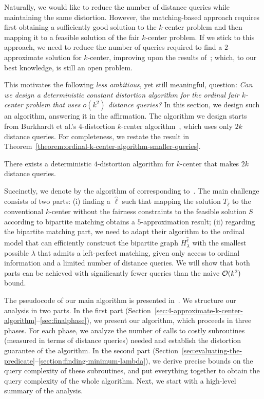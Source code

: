 
Naturally, we would like to reduce the number of distance queries while maintaining the same distortion. However, the matching-based approach requires first obtaining a sufficiently good solution to the $k$-center problem and then mapping it to a feasible solution of the fair $k$-center problem. If we stick to this approach, we need to reduce the number of queries required to find a $2$-approximate solution for $k$-center, improving upon the results of~\citet{burkhardt2024low}; which, to our best knowledge, is still an open problem.

This motivates the following \emph{less ambitious}, yet still meaningful, question: \emph{Can we design a deterministic constant distortion algorithm for the ordinal fair $k$-center problem that uses $o(k^2)$ distance queries?}
In this section, we design such an algorithm, answering it in the affirmation. The algorithm we design starts from Burkhardt et al.'s $4$-distortion $k$-center algorithm~\cite{burkhardt2024low}, which uses only $2k$ distance queries. For completeness, we restate the result in Theorem~\ref{theorem:ordinal-k-center-algorithm-smaller-queries}.

\begin{theorem}
    \label{theorem:ordinal-k-center-algorithm-smaller-queries}
    There exists a deterministic $4$-distortion algorithm for $k$-center that makes $2k$ distance queries. 
\end{theorem}

Succinctly, we denote by \bcfrss the algorithm of \citet{burkhardt2024low} corresponding to~.
The main challenge consists of two parts: (i) finding a $\hat{\ell}$ such that mapping the solution $T_{\hat{\ell}}$ to the conventional $k$-center without the fairness constraints to the feasible solution $S$ according to bipartite matching obtains a $5$-approximation result; (ii) regarding the bipartite matching part, we need to adapt their algorithm to the ordinal model that can efficiently construct the bipartite graph $H^{\hat{\ell}}_{\lambda}$ with the smallest possible $\lambda$ that admits a left-perfect matching, given only access to ordinal information and a limited number of distance queries.
We will show that both parts can be achieved with significantly fewer queries than the naive $\mathcal{O}(k^2)$ bound.

The pseudocode of our main algorithm is presented in~. 
We structure our analysis in two parts. 
In the first part (Section~\ref{sec:4-approximate-k-center-algorithm}--\ref{sec:finalphase}), we present our algorithm, which proceeds in three phases. 
For each phase, we analyze the number of calls to costly subroutines (measured in terms of distance queries) needed and establish the distortion guarantee of the algorithm.
In the second part (Section~\ref{sec:evaluating-the-predicate}--\ref{section:finding-minimum-lambda}), we derive precise bounds on the query complexity of these subroutines, and put everything together to obtain the query complexity of the whole algorithm.
Next, we start with a high-level summary of the analysis.
